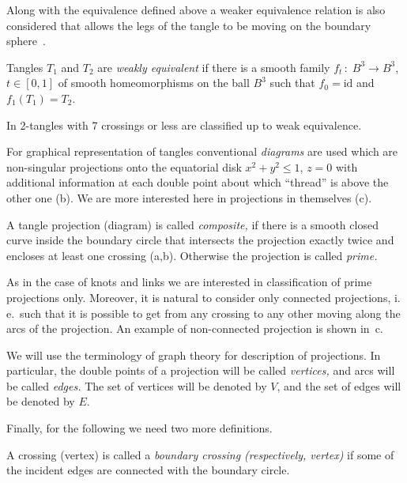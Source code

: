 \documentclass[12pt]{article}
\begin{document}

Along with the equivalence defined above a weaker equivalence relation is also considered that
allows the legs of the tangle to be moving on the boundary sphere~\cite{Sundberg1998}.

\begin{dfn}\label{weakeq} Tangles $T_1$ and $T_2$ are {\it weakly equivalent\/} if there is a smooth
family $f_t\,{:}\;B^3\to B^3$, $t\in[0,1]$ of smooth homeomorphisms on the ball $B^3$ such that
$f_0=\mathrm{id}$ and $f_1(T_1)=T_2$.\end{dfn}

In \cite{Kanenobu2003} 2-tangles with 7 crossings or less are classified up to weak equivalence.

For graphical representation of tangles conventional {\it diagrams\/} are used which are
non-singular projections onto the equatorial disk $x^2+y^2\le1$, $z=0$ with additional
information at each double point about which ``thread'' is above the other one
(b). We are more interested here in projections in themselves
(c).

\begin{dfn} A tangle projection (diagram) is called {\it composite,} if there is a smooth
closed curve inside the boundary circle that intersects the projection exactly twice and encloses
at least one crossing (a,b). Otherwise the projection is called {\it
prime.}\end{dfn}


As in the case of knots and links we are interested in classification of prime projections only.
Moreover, it is natural to consider only connected projections, i.\,e.~such that it is possible
to get from any crossing to any other moving along the arcs of the projection. An example of
non-connected projection is shown in~c.

We will use the terminology of graph theory for description of projections. In particular, the
double points of a projection will be called {\it vertices,} and arcs will be called {\it edges.}
The set of vertices will be denoted by $V$, and the set of edges will be denoted by $E$.

Finally, for the following we need two more definitions.

\begin{dfn} A crossing (vertex) is called a {\it boundary crossing (respectively, vertex)} if some of the
incident edges are connected with the boundary circle.\end{dfn}
\end{document}
